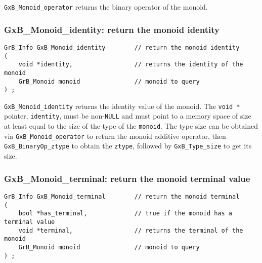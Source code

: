 \documentclass[12pt]{article}
\begin{document}
\verb'GxB_Monoid_operator' returns the binary operator of the monoid.

\subsubsection{{\sf GxB\_Monoid\_identity:} return the monoid identity}
\label{monoid_identity}

\begin{mdframed}[userdefinedwidth=6in]
{\footnotesize
\begin{verbatim}
GrB_Info GxB_Monoid_identity        // return the monoid identity
(
    void *identity,                 // returns the identity of the monoid
    GrB_Monoid monoid               // monoid to query
) ;
\end{verbatim}
} \end{mdframed}

\verb'GxB_Monoid_identity' returns the identity value of the monoid.  The
\verb'void *' pointer, \verb'identity', must be non-\verb'NULL' and must point
to a memory space of size at least equal to the size of the type of the
\verb'monoid'.  The type size can be obtained via \verb'GxB_Monoid_operator' to
return the monoid additive operator, then \verb'GxB_BinaryOp_ztype' to obtain
the \verb'ztype', followed by \verb'GxB_Type_size' to get its size.

\newpage
\subsubsection{{\sf GxB\_Monoid\_terminal:} return the monoid terminal value}
\label{monoid_terminal}

\begin{mdframed}[userdefinedwidth=6in]
{\footnotesize
\begin{verbatim}
GrB_Info GxB_Monoid_terminal        // return the monoid terminal
(
    bool *has_terminal,             // true if the monoid has a terminal value
    void *terminal,                 // returns the terminal of the monoid
    GrB_Monoid monoid               // monoid to query
) ;
\end{verbatim}
} \end{mdframed}
\end{document}
